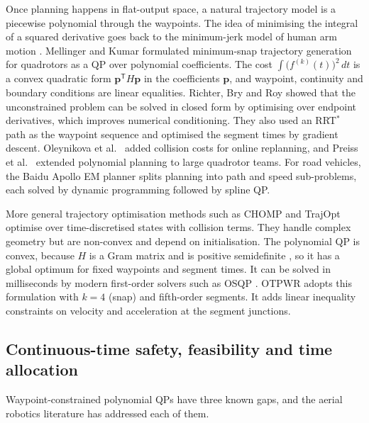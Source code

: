 \documentclass[11pt,a4paper]{article}
\begin{document}
Once planning happens in flat-output space, a natural trajectory model is a
piecewise polynomial through the waypoints. The idea of minimising the
integral of a squared derivative goes back to the minimum-jerk model of human
arm motion \citep{flash1985coordination}. Mellinger and Kumar
\citep{mellinger2011minimum} formulated minimum-snap trajectory generation
for quadrotors as a QP over polynomial coefficients. The cost
$\int\!\big(f^{(k)}(t)\big)^2\,dt$ is a convex quadratic form
$\mathbf p^{\mathsf T}H\mathbf p$ in the coefficients $\mathbf p$, and
waypoint, continuity and boundary conditions are linear equalities. Richter,
Bry and Roy \citep{richter2016polynomial} showed that the unconstrained
problem can be solved in closed form by optimising over endpoint derivatives,
which improves numerical conditioning. They also used an RRT$^\ast$ path as
the waypoint sequence and optimised the segment times by gradient descent.
Oleynikova et al.\ \citep{oleynikova2016continuous} added collision costs for
online replanning, and Preiss et al.\ \citep{preiss2017downwash} extended
polynomial planning to large quadrotor teams. For road vehicles, the Baidu
Apollo EM planner \citep{fan2018baidu} splits planning into path and speed
sub-problems, each solved by dynamic programming followed by spline QP.

More general trajectory optimisation methods such as CHOMP
\citep{ratliff2009chomp} and TrajOpt \citep{schulman2014motion} optimise over
time-discretised states with collision terms. They handle complex geometry
but are non-convex and depend on initialisation. The polynomial QP is convex,
because $H$ is a Gram matrix and is positive semidefinite
\citep{boyd2004convex}, so it has a global optimum for fixed waypoints and
segment times. It can be solved in milliseconds by modern first-order solvers
such as OSQP \citep{stellato2020osqp}. OTPWR adopts this formulation with
$k=4$ (snap) and fifth-order segments. It adds linear inequality constraints
on velocity and acceleration at the segment junctions.

\subsection{Continuous-time safety, feasibility and time allocation}
\label{sec:lit-safe}

Waypoint-constrained polynomial QPs have three known gaps, and the aerial
robotics literature has addressed each of them.
\end{document}
